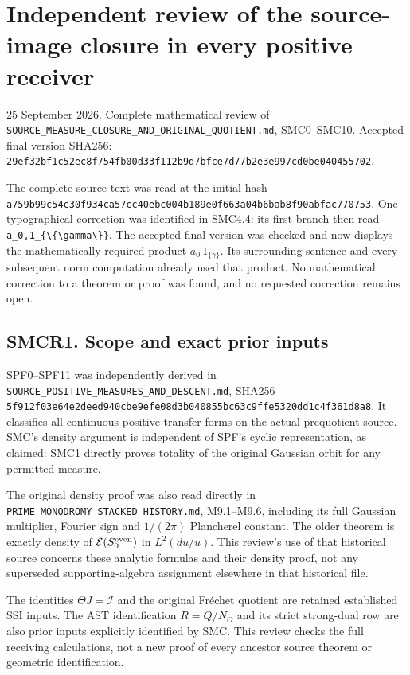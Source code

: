 \section{Independent review of the source-image closure in every
positive
receiver}\label{independent-review-of-the-source-image-closure-in-every-positive-receiver}

25 September 2026. Complete mathematical review of
\nolinkurl{SOURCE_MEASURE_CLOSURE_AND_ORIGINAL_QUOTIENT.md},
SMC0--SMC10. Accepted final version SHA256:
\nolinkurl{29ef32bf1c52ec8f754fb00d33f112b9d7bfce7d77b2e3e997cd0be040455702}.

The complete source text was read at the initial hash
\nolinkurl{a759b99c54c30f934ca57cc40ebc004b189e0f663a04b6bab8f90abfac770753}.
One typographical correction was identified in SMC4.4: its first branch
then read
\texttt{a\_0,1\_\{\textbackslash{}\{\textbackslash{}gamma\textbackslash{}\}\}}.
The accepted final version was checked and now displays the
mathematically required product \(a_0\,1_{\{\gamma\}}\). Its surrounding
sentence and every subsequent norm computation already used that
product. No mathematical correction to a theorem or proof was found, and
no requested correction remains open.

\subsection{SMCR1. Scope and exact prior
inputs}\label{smcr1.-scope-and-exact-prior-inputs}

SPF0--SPF11 was independently derived in
\nolinkurl{SOURCE_POSITIVE_MEASURES_AND_DESCENT.md}, SHA256
\nolinkurl{5f912f03e64e2deed940cbe9efe08d3b040855bc63c9ffe5320dd1c4f361d8a8}.
It classifies all continuous positive transfer forms on the actual
prequotient source. SMC's density argument is independent of SPF's
cyclic representation, as claimed: SMC1 directly proves totality of the
original Gaussian orbit for any permitted measure.

The original density proof was also read directly in
\nolinkurl{PRIME_MONODROMY_STACKED_HISTORY.md}, M9.1--M9.6, including
its full Gaussian multiplier, Fourier sign and \(1/(2\pi)\) Plancherel
constant. The older theorem is exactly density of
\(\mathcal E(S_0^{\rm even})\) in \(L^2(du/u)\). This review's use of
that historical source concerns these analytic formulas and their
density proof, not any superseded supporting-algebra assignment
elsewhere in that historical file.

The identities \(\Theta J=\mathcal I\) and the original Fréchet quotient
are retained established SSI inputs. The AST identification \(R=Q/N_O\)
and its strict strong-dual row are also prior inputs explicitly
identified by SMC. This review checks the full receiving calculations,
not a new proof of every ancestor source theorem or geometric
identification.

